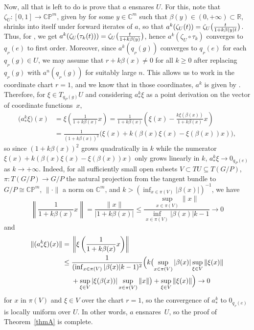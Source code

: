 \documentclass[10pt,a4paper]{amsart}
\numberwithin{equation}{section}
\theoremstyle{definition}
\begin{document}
Now, all that is left to do is prove that $a$ ensnares $U$. For this, note that $\zeta_U\colon [0,1]\to\mathbb{CP}^m$, given by  for some $y\in\mathbb{C}^m$ such that $\beta(y)\in(0,+\infty)\subset\mathbb{R}$, shrinks into itself under forward iterates of $a$, so that $a^k(\zeta_U(t))=\smash{\zeta_U\bigl(\tfrac{t}{1+k\beta(y)t}\bigr)}$. Thus, for , we get $a^k(\zeta_U(\tau_k(t)))=\smash{\zeta_U\bigl(\tfrac{t}{1+k\beta(y)}\bigr)}$, hence $a^k(\zeta_U\circ\tau_k)$ converges to $q_{{}_P}(e)$ to first order.
Moreover, since $a^k(q_{{}_P}(g))$ converges to $q_{{}_P}(e)$ for each $q_{{}_P}(g)\in U$, we may assume that $r+k\beta(x)\neq 0$ for all $k\geq 0$ after replacing $q_{{}_P}(g)$ with $a^n(q_{{}_P}(g))$ for suitably large $n$. This allows us to work in the coordinate chart $r=1$, and we know that in those coordinates, $a^k$ is given by . Therefore, for $\xi\in T_{q_P(g)}U$ and considering $a^k_*\xi$ as a point derivation on the vector of coordinate functions~$x$,
\begin{align*}
\bigl(a^k_*\xi\bigr)(x) & =\xi\left(\frac{1}{1+k\beta(x)}x\right)=\frac{1}{1+k\beta(x)}\left(\xi(x)-\frac{k\xi(\beta(x))}{1+k\beta(x)}x\right) \\ & =\frac{1}{(1+k\beta(x))^2}\big(\xi(x)+k(\beta(x)\xi(x)-\xi(\beta(x))x)\big),
\end{align*}
so since $(1+k\beta(x))^2$ grows quadratically in $k$ while the numerator $\xi(x)+k(\beta(x)\xi(x)-\xi(\beta(x))x)$ only grows linearly in $k$, $a^k_*\xi\rightarrow 0_{q_P(e)}$ as $k\rightarrow+\infty$. Indeed, for all sufficiently small open subsets $V\subset TU\subseteq T(G/P)$, $\pi\colon T(G/P)\to G/P$ the natural projection from the tangent bundle to $G/P\cong\mathbb{CP}^m$, $\|\cdot\|$ a norm on $\mathbb{C}^m$, and $k>(\inf_{x\in\pi(V)}|\beta(x)|)^{-1}$, we have
\[
\left\|\frac{1}{1+k\beta(x)}x\right\|=\frac{\|x\|}{|1+k\beta(x)|} \leq\frac{\sup_{x\in\pi(V)}\|x\|}{\inf_{x\in\pi(V)}|\beta(x)|k-1}\rightarrow 0\]
and
\begin{align*}
\|(a^k_*\xi)(x)\| ={}&\left\|\xi\left(\frac{1}{1+k\beta(x)}x\right)\right\| \\ \leq{} &\frac{1}{(\inf_{x\in\pi(V)}|\beta(x)|k-1)^2}\Bigl(k\bigl(\sup_{x\in\pi(V)}|\beta(x)|\sup_{\xi\in V}\|\xi(x)\| \\ & +\sup_{\xi\in V}|\xi(\beta(x))|\sup_{x\in\pi(V)}\|x\|\bigr)+\sup_{\xi\in V}\|\xi(x)\|\Bigr)\rightarrow 0
\end{align*}
for $x$ in $\pi(V)$ and $\xi\in V$ over the chart $r=1$, so the convergence of $a^k_*$ to $0_{q_{{}_P}(e)}$ is locally uniform over $U$. In other words, $a$ ensnares~$U$, so the proof of Theorem~\ref{thmA} is complete.
\end{document}
